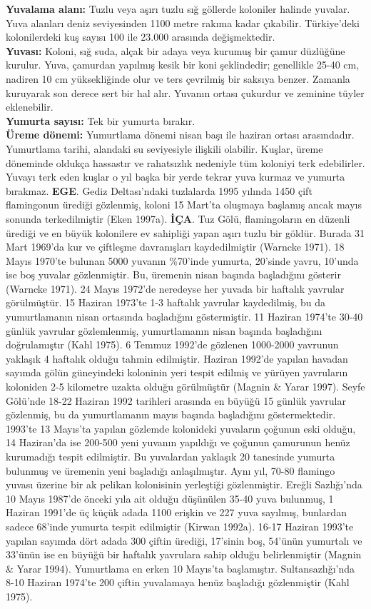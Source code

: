 \documentclass[
  letterpaper,
  DIV=11,
  numbers=noendperiod]{scrreprt}
\begin{document}
\textbf{Yuvalama alanı:} Tuzlu veya aşırı tuzlu sığ göllerde koloniler
halinde yuvalar. Yuva alanları deniz seviyesinden 1100 metre rakıma
kadar çıkabilir. Türkiye'deki kolonilerdeki kuş sayısı 100 ile 23.000
arasında değişmektedir.\\
\textbf{Yuvası:} Koloni, sığ suda, alçak bir adaya veya kurumuş bir
çamur düzlüğüne kurulur. Yuva, çamurdan yapılmış kesik bir koni
şeklindedir; genellikle 25-40 cm, nadiren 10 cm yüksekliğinde olur ve
ters çevrilmiş bir saksıya benzer. Zamanla kuruyarak son derece sert bir
hal alır. Yuvanın ortası çukurdur ve zeminine tüyler eklenebilir.\\
\textbf{Yumurta sayısı:} Tek bir yumurta bırakır.\\
\textbf{Üreme dönemi:} Yumurtlama dönemi nisan başı ile haziran ortası
arasındadır. Yumurtlama tarihi, alandaki su seviyesiyle ilişkili
olabilir. Kuşlar, üreme döneminde oldukça hassastır ve rahatsızlık
nedeniyle tüm koloniyi terk edebilirler. Yuvayı terk eden kuşlar o yıl
başka bir yerde tekrar yuva kurmaz ve yumurta bırakmaz. \textbf{EGE}.
Gediz Deltası'ndaki tuzlalarda 1995 yılında 1450 çift flamingonun
ürediği gözlenmiş, koloni 15 Mart'ta oluşmaya başlamış ancak mayıs
sonunda terkedilmiştir (Eken 1997a). \textbf{İÇA}. Tuz Gölü,
flamingoların en düzenli ürediği ve en büyük kolonilere ev sahipliği
yapan aşırı tuzlu bir göldür. Burada 31 Mart 1969'da kur ve çiftleşme
davranışları kaydedilmiştir (Warncke 1971). 18 Mayıs 1970'te bulunan
5000 yuvanın \%70'inde yumurta, 20'sinde yavru, 10'unda ise boş yuvalar
gözlenmiştir. Bu, üremenin nisan başında başladığını gösterir (Warncke
1971). 24 Mayıs 1972'de neredeyse her yuvada bir haftalık yavrular
görülmüştür. 15 Haziran 1973'te 1-3 haftalık yavrular kaydedilmiş, bu da
yumurtlamanın nisan ortasında başladığını göstermiştir. 11 Haziran
1974'te 30-40 günlük yavrular gözlemlenmiş, yumurtlamanın nisan başında
başladığını doğrulamıştır (Kahl 1975). 6 Temmuz 1992'de gözlenen
1000-2000 yavrunun yaklaşık 4 haftalık olduğu tahmin edilmiştir. Haziran
1992'de yapılan havadan sayımda gölün güneyindeki koloninin yeri tespit
edilmiş ve yürüyen yavruların koloniden 2-5 kilometre uzakta olduğu
görülmüştür (Magnin \& Yarar 1997). Seyfe Gölü'nde 18-22 Haziran 1992
tarihleri arasında en büyüğü 15 günlük yavrular gözlenmiş, bu da
yumurtlamanın mayıs başında başladığını göstermektedir. 1993'te 13
Mayıs'ta yapılan gözlemde kolonideki yuvaların çoğunun eski olduğu, 14
Haziran'da ise 200-500 yeni yuvanın yapıldığı ve çoğunun çamurunun henüz
kurumadığı tespit edilmiştir. Bu yuvalardan yaklaşık 20 tanesinde
yumurta bulunmuş ve üremenin yeni başladığı anlaşılmıştır. Aynı yıl,
70-80 flamingo yuvası üzerine bir ak pelikan kolonisinin yerleştiği
gözlenmiştir. Ereğli Sazlığı'nda 10 Mayıs 1987'de önceki yıla ait olduğu
düşünülen 35-40 yuva bulunmuş, 1 Haziran 1991'de üç küçük adada 1100
erişkin ve 227 yuva sayılmış, bunlardan sadece 68'inde yumurta tespit
edilmiştir (Kirwan 1992a). 16-17 Haziran 1993'te yapılan sayımda dört
adada 300 çiftin ürediği, 17'sinin boş, 54'ünün yumurtalı ve 33'ünün ise
en büyüğü bir haftalık yavrulara sahip olduğu belirlenmiştir (Magnin \&
Yarar 1994). Yumurtlama en erken 10 Mayıs'ta başlamıştır.
Sultansazlığı'nda 8-10 Haziran 1974'te 200 çiftin yuvalamaya henüz
başladığı gözlenmiştir (Kahl 1975).
\end{document}
